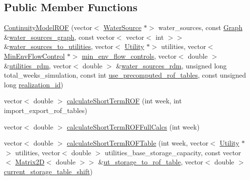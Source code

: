 \subsection*{Public Member Functions}
\begin{DoxyCompactItemize}
\item 
\mbox{\hyperlink{classContinuityModelROF_a23bd422349e4e2246bd44b2007564fd1_a23bd422349e4e2246bd44b2007564fd1}{Continuity\+Model\+R\+OF}} (vector$<$ \mbox{\hyperlink{classWaterSource}{Water\+Source}} $\ast$$>$ water\+\_\+sources, const \mbox{\hyperlink{classGraph}{Graph}} \&\mbox{\hyperlink{classContinuityModel_a563401588c6fa622f03393909a3522db_a563401588c6fa622f03393909a3522db}{water\+\_\+sources\+\_\+graph}}, const vector$<$ vector$<$ int $>$$>$ \&\mbox{\hyperlink{classContinuityModel_ae8516bcbbf52650190277fc8b06c1843_ae8516bcbbf52650190277fc8b06c1843}{water\+\_\+sources\+\_\+to\+\_\+utilities}}, vector$<$ \mbox{\hyperlink{classUtility}{Utility}} $\ast$$>$ utilities, vector$<$ \mbox{\hyperlink{classMinEnvFlowControl}{Min\+Env\+Flow\+Control}} $\ast$$>$ \mbox{\hyperlink{classContinuityModel_afc991e5c0d144020e49a97751a04b302_afc991e5c0d144020e49a97751a04b302}{min\+\_\+env\+\_\+flow\+\_\+controls}}, vector$<$ double $>$ \&\mbox{\hyperlink{classContinuityModel_aa4a00b76da6295d2faa11e3dcaea1896_aa4a00b76da6295d2faa11e3dcaea1896}{utilities\+\_\+rdm}}, vector$<$ double $>$ \&\mbox{\hyperlink{classContinuityModel_ab7b8fa93a6f56b328e425e1ead6cfefa_ab7b8fa93a6f56b328e425e1ead6cfefa}{water\+\_\+sources\+\_\+rdm}}, unsigned long total\+\_\+weeks\+\_\+simulation, const int \mbox{\hyperlink{classContinuityModelROF_a384967647c98d9768400de07e2bc7dab_a384967647c98d9768400de07e2bc7dab}{use\+\_\+precomputed\+\_\+rof\+\_\+tables}}, const unsigned long \mbox{\hyperlink{classContinuityModel_a7b6c99bf256f6c6b633ebb78282f43c7_a7b6c99bf256f6c6b633ebb78282f43c7}{realization\+\_\+id}})
\item 
vector$<$ double $>$ \mbox{\hyperlink{classContinuityModelROF_a927597ce427aa9a9f65719bccbfba623_a927597ce427aa9a9f65719bccbfba623}{calculate\+Short\+Term\+R\+OF}} (int week, int import\+\_\+export\+\_\+rof\+\_\+tables)
\item 
vector$<$ double $>$ \mbox{\hyperlink{classContinuityModelROF_afcf6c32935729d64dc2fdc021241c5e9_afcf6c32935729d64dc2fdc021241c5e9}{calculate\+Short\+Term\+R\+O\+F\+Full\+Calcs}} (int week)
\item 
vector$<$ double $>$ \mbox{\hyperlink{classContinuityModelROF_acd0dd0324718521f49eb344dbba6684d_acd0dd0324718521f49eb344dbba6684d}{calculate\+Short\+Term\+R\+O\+F\+Table}} (int week, vector$<$ \mbox{\hyperlink{classUtility}{Utility}} $\ast$$>$ utilities, vector$<$ double $>$ utilities\+\_\+base\+\_\+storage\+\_\+capacity, const vector$<$ \mbox{\hyperlink{classMatrix2D}{Matrix2D}}$<$ double $>$$>$ \&\mbox{\hyperlink{classContinuityModelROF_ada25d241caf860255ad00097f5e7adb6_ada25d241caf860255ad00097f5e7adb6}{ut\+\_\+storage\+\_\+to\+\_\+rof\+\_\+table}}, vector$<$ double $>$ \mbox{\hyperlink{classContinuityModelROF_a443efa8d5a8bcbb1fea1a0bc929c77cd_a443efa8d5a8bcbb1fea1a0bc929c77cd}{current\+\_\+storage\+\_\+table\+\_\+shift}})

\end{DoxyCompactItemize}
